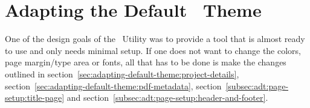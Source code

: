 
\chapter{Adapting the Default \productName~Theme}
	\label{chap:adapting-default-theme}
	One of the design goals of the \productName~Utility was to provide a tool that is almost ready to use and only needs minimal setup. If one does not want to change the colors, page margin/type area or fonts, all that has to be done is make the changes outlined in \mbox{section \ref{sec:adapting-default-theme:project-details}}, \mbox{section \ref{sec:adapting-default-theme:pdf-metadata}}, \mbox{section \ref{subsec:adt:page-setup:title-page}} and \mbox{section \ref{subsec:adt:page-setup:header-and-footer}}.
	
